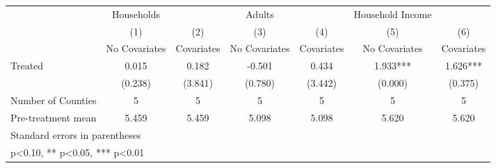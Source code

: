 {
\def\sym#1{\ifmmode^{#1}\else\(^{#1}\)\fi}
\begin{tabular}{l*{6}{c}}
\hline\hline
            &  Households   &               &      Adults   &               &Household Income   &               \\
            &\multicolumn{1}{c}{(1)}&\multicolumn{1}{c}{(2)}&\multicolumn{1}{c}{(3)}&\multicolumn{1}{c}{(4)}&\multicolumn{1}{c}{(5)}&\multicolumn{1}{c}{(6)}\\
            &\multicolumn{1}{c}{No Covariates}&\multicolumn{1}{c}{Covariates}&\multicolumn{1}{c}{No Covariates}&\multicolumn{1}{c}{Covariates}&\multicolumn{1}{c}{No Covariates}&\multicolumn{1}{c}{Covariates}\\
\hline
Treated     &       0.015   &       0.182   &      -0.501   &       0.434   &       1.933***&       1.626***\\
            &     (0.238)   &     (3.841)   &     (0.780)   &     (3.442)   &     (0.000)   &     (0.375)   \\
\hline
Number of Counties&           5   &           5   &           5   &           5   &           5   &           5   \\
Pre-treatment mean&       5.459   &       5.459   &       5.098   &       5.098   &       5.620   &       5.620   \\
\hline\hline
\multicolumn{7}{l}{\footnotesize Standard errors in parentheses}\\
\multicolumn{7}{l}{\footnotesize * p<0.10, ** p<0.05, *** p<0.01}\\
\end{tabular}
}
